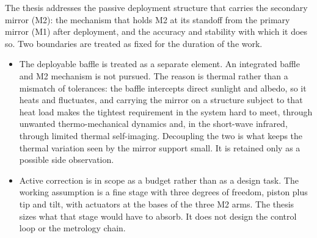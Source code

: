 The thesis addresses the passive deployment structure that carries the secondary mirror (M2): the mechanism that holds M2 at its standoff from the primary mirror (M1) after deployment, and the accuracy and stability with which it does so. Two boundaries are treated as fixed for the duration of the work.

\begin{itemize}
    \item The deployable baffle is treated as a separate element. An integrated baffle and M2 mechanism is not pursued. The reason is thermal rather than a mismatch of tolerances: the baffle intercepts direct sunlight and albedo, so it heats and fluctuates, and carrying the mirror on a structure subject to that heat load makes the tightest requirement in the system hard to meet, through unwanted thermo-mechanical dynamics and, in the short-wave infrared, through limited thermal self-imaging. Decoupling the two is what keeps the thermal variation seen by the mirror support small. It is retained only as a possible side observation.
    \item Active correction is in scope as a budget rather than as a design task. The working assumption is a fine stage with three degrees of freedom, piston plus tip and tilt, with actuators at the bases of the three M2 arms. The thesis sizes what that stage would have to absorb. It does not design the control loop or the metrology chain.
\end{itemize}

